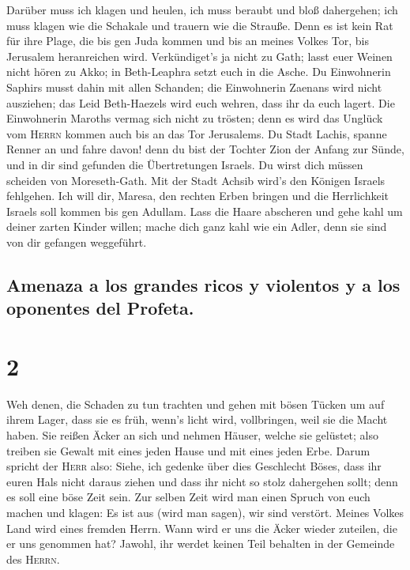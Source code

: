  Darüber muss ich klagen und heulen, ich muss beraubt und
bloß dahergehen; ich muss klagen wie die Schakale und trauern wie die
Strauße.  Denn es ist kein Rat für ihre Plage, die bis gen
Juda kommen und bis an meines Volkes Tor, bis Jerusalem heranreichen
wird.  Verkündiget's ja nicht zu Gath; lasst euer Weinen
nicht hören zu Akko; in Beth-Leaphra setzt euch in die Asche.
 Du Einwohnerin Saphirs musst dahin mit allen Schanden;
die Einwohnerin Zaenans wird nicht ausziehen; das Leid Beth-Haezels wird
euch wehren, dass ihr da euch lagert.  Die Einwohnerin
Maroths vermag sich nicht zu trösten; denn es wird das Unglück vom
\textsc{Herrn} kommen auch bis an das Tor Jerusalems.  Du
Stadt Lachis, spanne Renner an und fahre davon! denn du bist der Tochter
Zion der Anfang zur Sünde, und in dir sind gefunden die Übertretungen
Israels.  Du wirst dich müssen scheiden von
Moreseth-Gath. Mit der Stadt Achsib wird's den Königen Israels
fehlgehen.  Ich will dir, Maresa, den rechten Erben
bringen und die Herrlichkeit Israels soll kommen bis gen Adullam.
 Lass die Haare abscheren und gehe kahl um deiner zarten
Kinder willen; mache dich ganz kahl wie ein Adler, denn sie sind von dir
gefangen weggeführt.

\hypertarget{amenaza-a-los-grandes-ricos-y-violentos-y-a-los-oponentes-del-profeta.}{%
\subsection{Amenaza a los grandes ricos y violentos y a los oponentes
del
Profeta.}\label{amenaza-a-los-grandes-ricos-y-violentos-y-a-los-oponentes-del-profeta.}}

\hypertarget{section-1}{%
\section{2}\label{section-1}}

 Weh denen, die Schaden zu tun trachten und gehen mit
bösen Tücken um auf ihrem Lager, dass sie es früh, wenn's licht wird,
vollbringen, weil sie die Macht haben.  Sie reißen Äcker
an sich und nehmen Häuser, welche sie gelüstet; also treiben sie Gewalt
mit eines jeden Hause und mit eines jeden Erbe.  Darum
spricht der \textsc{Herr} also: Siehe, ich gedenke über dies Geschlecht
Böses, dass ihr euren Hals nicht daraus ziehen und dass ihr nicht so
stolz dahergehen sollt; denn es soll eine böse Zeit sein. 
Zur selben Zeit wird man einen Spruch von euch machen und klagen: Es ist
aus (wird man sagen), wir sind verstört. Meines Volkes Land wird eines
fremden Herrn. Wann wird er uns die Äcker wieder zuteilen, die er uns
genommen hat?  Jawohl, ihr werdet keinen Teil behalten in
der Gemeinde des \textsc{Herrn}.

